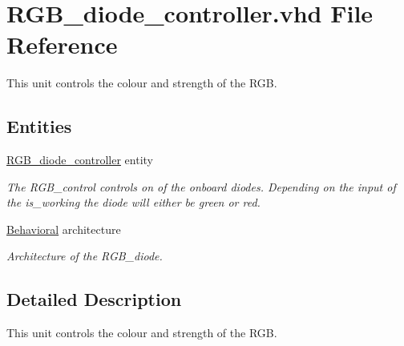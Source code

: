 \hypertarget{RGB__diode__controller_8vhd}{\section{R\-G\-B\-\_\-diode\-\_\-controller.\-vhd File Reference}
\label{RGB__diode__controller_8vhd}
}


This unit controls the colour and strength of the R\-G\-B.  


\subsection*{Entities}
\begin{DoxyCompactItemize}
\item 
\hyperlink{classRGB__diode__controller}{R\-G\-B\-\_\-diode\-\_\-controller} entity
\begin{DoxyCompactList}\small\item\em The R\-G\-B\-\_\-control controls on of the onboard diodes. Depending on the input of the is\-\_\-working the diode will either be green or red. \end{DoxyCompactList}\item 
\hyperlink{classRGB__diode__controller_1_1Behavioral}{Behavioral} architecture
\begin{DoxyCompactList}\small\item\em Architecture of the R\-G\-B\-\_\-diode. \end{DoxyCompactList}\end{DoxyCompactItemize}


\subsection{Detailed Description}
This unit controls the colour and strength of the R\-G\-B. 